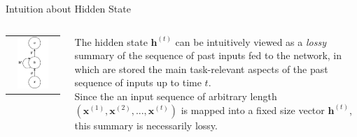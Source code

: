 \documentclass[aspectratio=169]{beamer}
\begin{document}

\begin{frame}{Intuition about Hidden State}
\begin{columns}
\begin{column}{0.3\textwidth}
\begin{tabular}{c}
	\includegraphics[width=0.7\textwidth]{img/rnn/vanilla_rnn.png}
\end{tabular}
\end{column}
\begin{column}{0.7\textwidth}
The hidden state $\bm{h}^{(t)}$ can be intuitively viewed as a \textit{lossy} summary of the sequence of past inputs fed to the network, in which are stored the main task-relevant aspects of the past sequence of inputs up to time $t$.\\
\vspace{0.5cm}
Since the an input sequence of arbitrary length $(\bm{x}^{(1)}, \bm{x}^{(2)}, ..., \bm{x}^{(t)})$ is mapped into a fixed size vector $\bm{h}^{(t)}$, this summary is necessarily lossy.
\end{column}
\end{columns}
\end{frame}
\end{document}
